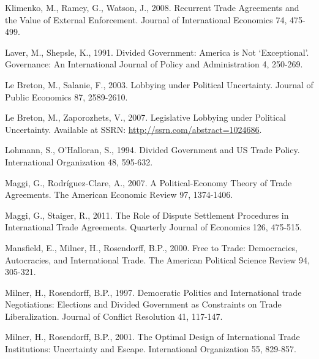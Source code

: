 \documentclass[10pt]{article}
\begin{document}
\begin{list}{}{\setlength{\leftmargin}{0.0in}\setlength{\rightmargin}{0.0in}\setlength{\itemindent}{0.0in}\setlength{\itemsep}{0.1in}}
\item Klimenko, M., Ramey, G., Watson, J., 2008. Recurrent Trade Agreements and the Value of External Enforcement. Journal of International Economics 74, 475-499.


\item Laver, M., Shepsle, K., 1991. Divided Government: America is Not `Exceptional'. Governance: An International Journal of Policy and Administration 4, 250-269.

\item Le Breton, M., Salanie, F., 2003. Lobbying under Political Uncertainty. Journal of Public Economics 87, 2589-2610.

\item Le Breton, M., Zaporozhets, V., 2007. Legislative Lobbying under Political Uncertainty. Available at SSRN: \url{http://ssrn.com/abstract=1024686}.

\item Lohmann, S., O'Halloran, S., 1994. Divided Government and US Trade Policy. International Organization 48, 595-632.

\item Maggi, G., Rodr\'{i}guez-Clare, A., 2007. A Political-Economy Theory of Trade Agreements. The American Economic Review 97, 1374-1406.

\item Maggi, G., Staiger, R., 2011. The Role of Dispute Settlement Procedures in International Trade Agreements. Quarterly Journal of Economics 126, 475-515.

\item Mansfield, E., Milner, H., Rosendorff, B.P., 2000. Free to Trade: Democracies, Autocracies, and International Trade. The American Political Science Review 94, 305-321.


\item Milner, H., Rosendorff, B.P., 1997. Democratic Politics and International trade Negotiations: Elections and Divided Government as Constraints on Trade Liberalization. Journal of Conflict Resolution 41, 117-147.

\item Milner, H., Rosendorff, B.P., 2001. The Optimal Design of International Trade Institutions: Uncertainty and Escape. International Organization 55, 829-857.


\end{list}
\end{document}
